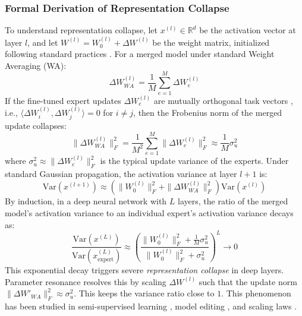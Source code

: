 \documentclass{article}
\theoremstyle{plain}
\theoremstyle{definition}
\theoremstyle{remark}
\begin{document}
\subsubsection{Formal Derivation of Representation Collapse}
To understand representation collapse, let $x^{(l)} \in \mathbb{R}^{d}$ be the activation vector at layer $l$, and let $W^{(l)} = W_0^{(l)} + \Delta W^{(l)}$ be the weight matrix, initialized following standard practices \cite{glorot2010understanding, he2015delving, frankle2019lottery, entezari2022role}. For a merged model under standard Weight Averaging (WA):
\begin{equation}
    \Delta W_{WA}^{(l)} = \frac{1}{M} \sum_{e=1}^M \Delta W_e^{(l)}
\end{equation}
If the fine-tuned expert updates $\Delta W_e^{(l)}$ are mutually orthogonal task vectors \cite{neyshabur2020what, mitchell2022fast}, i.e., $\langle \Delta W_i^{(l)}, \Delta W_j^{(l)} \rangle = 0$ for $i \neq j$, then the Frobenius norm of the merged update collapses:
\begin{equation}
    \|\Delta W_{WA}^{(l)}\|_F^2 = \frac{1}{M^2} \sum_{e=1}^M \|\Delta W_e^{(l)}\|_F^2 \approx \frac{1}{M} \sigma_u^2
\end{equation}
where $\sigma_u^2 \approx \|\Delta W_e^{(l)}\|_F^2$ is the typical update variance of the experts. Under standard Gaussian propagation, the activation variance at layer $l+1$ is:
\begin{equation}
    \text{Var}(x^{(l+1)}) \approx \left( \|W_0^{(l)}\|_F^2 + \|\Delta W_{WA}^{(l)}\|_F^2 \right) \text{Var}(x^{(l)})
\end{equation}
By induction, in a deep neural network with $L$ layers, the ratio of the merged model's activation variance to an individual expert's activation variance decays as:
\begin{equation}
    \frac{\text{Var}(x^{(L)})}{\text{Var}(x_{\text{expert}}^{(L)})} \approx \left( \frac{\|W_0^{(l)}\|_F^2 + \frac{1}{M}\sigma_u^2}{\|W_0^{(l)}\|_F^2 + \sigma_u^2} \right)^L \to 0
\end{equation}
This exponential decay triggers severe \emph{representation collapse} in deep layers. Parameter resonance resolves this by scaling $\Delta W^{(l)}$ such that the update norm $\|\Delta W'_{WA}\|_F^2 \approx \sigma_u^2$. This keeps the variance ratio close to $1$. This phenomenon has been studied in semi-supervised learning \cite{laine2017temporal}, model editing \cite{meng2022locating}, and scaling laws \cite{kaplan2020scaling}.
\end{document}
